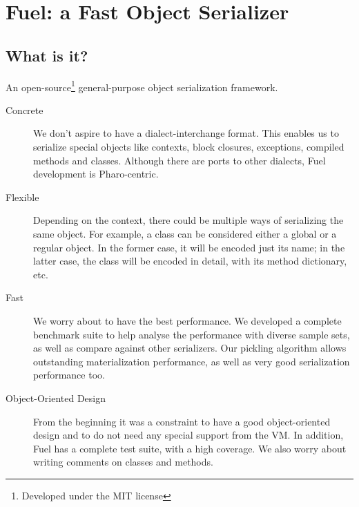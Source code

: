 \documentclass[a4paper,10pt,twoside]{book}
\begin{document}
\fi
\sloppy

\chapter{Fuel: a Fast Object Serializer}


\section{What is it?}

An open-source\footnote{Developed under the MIT license} general-purpose object serialization framework.



\begin{description}

\item[Concrete]
We don't aspire to have a dialect-interchange format. This enables us to serialize special objects like contexts, block closures, exceptions, compiled methods and classes. Although there are ports to other dialects, Fuel development is Pharo-centric.

\item[Flexible]
Depending on the context, there could be multiple ways of serializing the same object. For example, a class can be considered either a global or a regular object. In the former case, it will be encoded just its name; in the latter case, the class will be encoded in detail, with its method dictionary, etc.

\item[Fast]
We worry about to have the best performance. We developed a complete benchmark suite to help analyse the performance with diverse sample sets, as well as compare against other serializers. Our pickling algorithm allows outstanding materialization performance, as well as very good serialization performance too.

\item[Object-Oriented Design]
From the beginning it was a constraint to have a good object-oriented design and to do not need any special support from the VM. In addition, Fuel has a complete test suite, with a high coverage. We also worry about writing comments on classes and methods.

\end{description}
\end{document}
